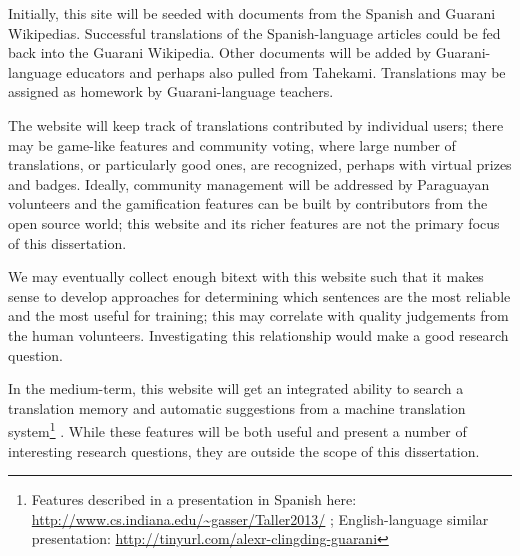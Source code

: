 Initially, this site will be seeded with documents from the Spanish and Guarani
Wikipedias. Successful translations of the Spanish-language articles could be
fed back into the Guarani Wikipedia. Other documents will be added by
Guarani-language educators and perhaps also pulled from Tahekami. Translations
may be assigned as homework by Guarani-language teachers.

The website will keep track of translations contributed by individual users;
there may be game-like features and community voting, where large number of
translations, or particularly good ones, are recognized, perhaps with virtual
prizes and badges.
Ideally, community management will be addressed by Paraguayan volunteers and
the gamification features can be built by contributors from the open source
world; this website and its richer features are not the primary focus of this
dissertation.

We may eventually collect enough bitext with this website such that it makes
sense to develop approaches for determining which sentences are the most
reliable and the most useful for training; this may correlate with quality
judgements from the human volunteers.
Investigating this relationship would make a good research question.

In the medium-term, this website will get an integrated ability to search
a translation memory and automatic suggestions from a machine translation
system\footnote{Features described in a presentation in Spanish here:
\url{http://www.cs.indiana.edu/~gasser/Taller2013/} ; English-language similar
presentation: \url{http://tinyurl.com/alexr-clingding-guarani} }
. While these features will be both useful and present a number of
interesting research questions, they are outside the scope of this
dissertation.
